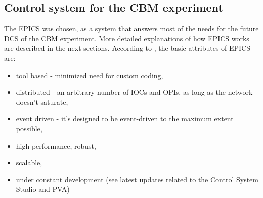 



\subsection{Control system for the CBM experiment}
The \gls{EPICS} was chosen, as a system that answers most of the needs for the future \gls{DCS} of the \gls{CBM} experiment. More detailed explanations of how \gls{EPICS} works are described in the next sections. According to \cite{EPICS_DOCS}, the basic attributes of \gls{EPICS} are:
\begin{itemize}
    \item tool based - minimized need for custom coding,
    \item distributed - an arbitrary number of \glspl{IOC} and \glspl{OPI}, as long as the network doesn't saturate,
    \item event driven - it's designed to be event-driven to the maximum extent possible,
    \item high performance, robust,
    \item scalable,
    \item under constant development (see latest updates related to the Control System Studio and PVA)
\end{itemize}

